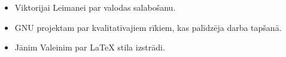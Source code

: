 \begin{itemize}
    \item Viktorijai Leimanei par valodas salabošanu.
    \item GNU projektam par kvalitatīvajiem rīkiem, kas palīdzēja darba tapšanā.
    \item Jānim Valeinim par \LaTeX{} stila izstrādi.
\end{itemize}
